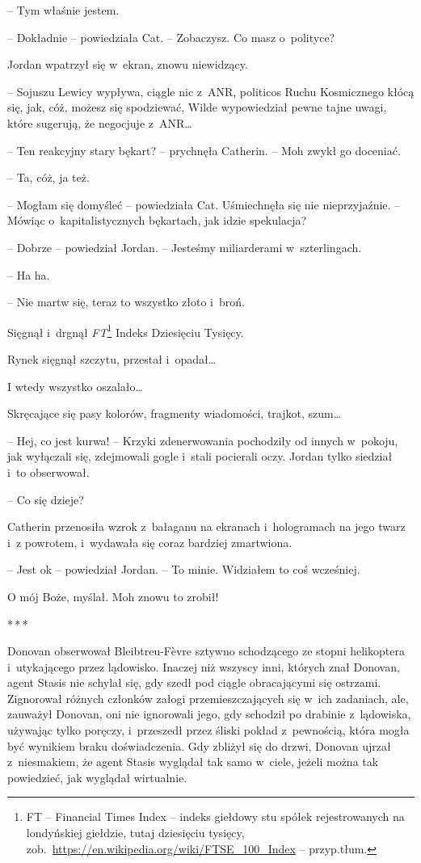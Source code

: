 \documentclass[oneside,polish,11pt,sfheadings]{mwbk}
\newcommand{\threeast}{\bigskip\par\centerline{*\,*\,*}\medskip\par}%
\begin{document}
-- Tym właśnie jestem.

-- Dokładnie -- powiedziała Cat. -- Zobaczysz. Co masz o~polityce?

Jordan wpatrzył się w~ekran, znowu niewidzący. 

-- Sojuszu Lewicy wypływa,
ciągle nic z~ANR, politicos Ruchu Kosmicznego kłócą się, jak, cóż,
możesz się spodziewać, Wilde wypowiedział pewne tajne uwagi, które
sugerują, że negocjuje z~ANR\ldots

-- Ten reakcyjny stary bękart? -- prychnęła Catherin. -- Moh zwykł go
doceniać.

-- Ta, cóż, ja też.

-- Mogłam się domyśleć -- powiedziała Cat. Uśmiechnęła się nie
nieprzyjaźnie. -- Mówiąc o~kapitalistycznych bękartach, jak idzie
spekulacja?

-- Dobrze -- powiedział Jordan. -- Jesteśmy miliarderami w~szterlingach.

-- Ha ha.

-- Nie martw się, teraz to wszystko złoto i~broń.

Sięgnął i~drgnął \emph{FT}\footnote{FT -- Financial Times Index -- indeks giełdowy stu spółek rejestrowanych na
londyńskiej giełdzie, tutaj dziesięciu tysięcy,
zob.~\url{https://en.wikipedia.org/wiki/FTSE\_100\_Index} -- przyp.tłum.} Indeks Dziesięciu Tysięcy. 

Rynek sięgnął szczytu, przestał i~opadał\ldots

I wtedy wszystko oszalało\ldots

Skręcające się pasy kolorów, fragmenty wiadomości, trajkot, szum\ldots

-- Hej, co jest kurwa! -- Krzyki zdenerwowania pochodziły od innych w~pokoju, jak wyłączali się, zdejmowali gogle i~stali pocierali oczy.
Jordan tylko siedział i~to obserwował.

-- Co się dzieje?

Catherin przenosiła wzrok z~bałaganu na ekranach i~hologramach na jego
twarz i~z powrotem, i~wydawała się coraz bardziej zmartwiona.

-- Jest ok -- powiedział Jordan. -- To minie. Widziałem to coś wcześniej.

O mój Boże, myślał. Moh znowu to zrobił!
  \threeast 

Donovan obserwował Bleibtreu-Fèvre sztywno schodzącego ze stopni
helikoptera i~utykającego przez lądowisko. Inaczej niż wszyscy inni,
których znał Donovan, agent Stasis nie schylał się, gdy szedł pod ciągle
obracającymi się ostrzami. Zignorował różnych członków załogi
przemieszczających się w~ich zadaniach, ale, zauważył Donovan, oni nie
ignorowali jego, gdy schodził po drabinie z~lądowiska, używając tylko
poręczy, i~przeszedł przez śliski pokład z~pewnością, która mogła być
wynikiem braku doświadczenia. Gdy zbliżył się do drzwi, Donovan ujrzał z~niesmakiem, że agent Stasis wyglądał tak samo w~ciele, jeżeli można tak
powiedzieć, jak wyglądał wirtualnie.
\end{document}
